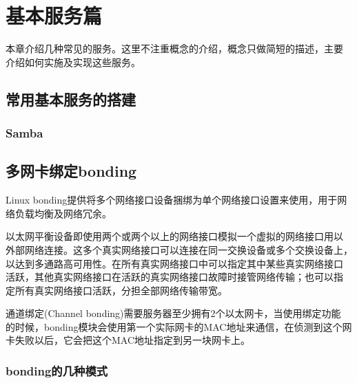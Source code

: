 \part{基本服务篇}

本章介绍几种常见的服务。这里不注重概念的介绍，概念只做简短的描述，主要
介绍如何实施及实现这些服务。

\chapter{常用基本服务的搭建}











\section{Samba}









\chapter{多网卡绑定bonding}

Linux bonding提供将多个网络接口设备捆绑为单个网络接口设置来使用，用于网
络负载均衡及网络冗余。

以太网平衡设备即使用两个或两个以上的网络接口模拟一个虚拟的网络接口用以
外部网络连接。这多个真实网络接口可以连接在同一交换设备或多个交换设备上，
以达到多通路高可用性。在所有真实网络接口中可以指定其中某些真实网络接口
活跃，其他真实网络接口在活跃的真实网络接口故障时接管网络传输；也可以指
定所有真实网络接口活跃，分担全部网络传输带宽。
 
通道绑定(Channel bonding)需要服务器至少拥有2个以太网卡，当使用绑定功能
的时候，bonding模块会使用第一个实际网卡的MAC地址来通信，在侦测到这个网
卡失败以后，它会把这个MAC地址指定到另一块网卡上。

\section{bonding的几种模式}

